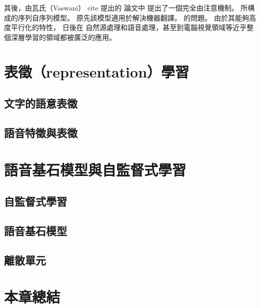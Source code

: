 其後，由瓦氏（Vaswani） cite 提出的 論文中 提出了一個完全由注意機制。 所構成的序列自序列模型。 原先該模型適用於解決機器翻譯。 的問題。
由於其能夠高度平行化的特性， 日後在 自然源處理和語音處理，甚至到電腦視覺領域等近乎整個深層學習的領域都被廣泛的應用。  


\section{表徵（representation）學習}

\subsection{文字的語意表徵}



\subsection{語音特徵與表徵}


\section{語音基石模型與自監督式學習}

\subsection{自監督式學習}

\subsection{語音基石模型}

\subsection{離散單元}


\section{本章總結}


